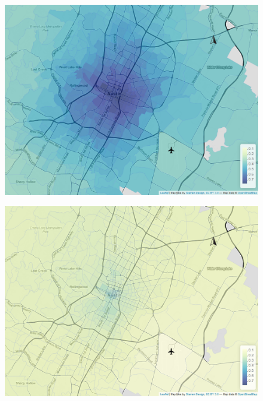 \begin{figure}[htb]
    \centering
    \begin{minipage}[t]{0.48\linewidth}
        \centering
        \includegraphics[width=\linewidth]{img/tailprob_34_74__9.png}
        \label{fig:wages:appendix3:a}
    \end{minipage}
    \begin{minipage}[t]{0.48\linewidth}
        \centering
        \includegraphics[width=\linewidth]{img/tailprob_34_74__43.png}
        \label{fig:wages:appendix3:b}
    \end{minipage}\hfill
    \begin{minipage}[t]{.48\linewidth}

\end{minipage}
\end{figure}
